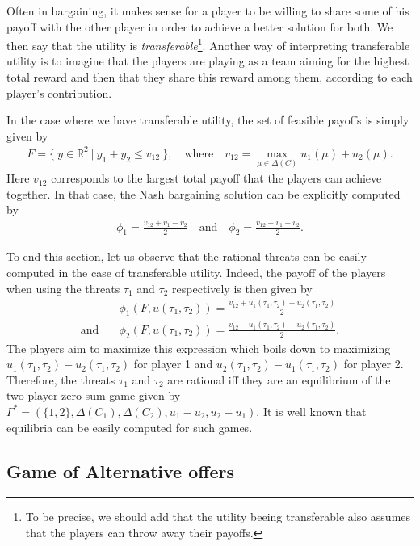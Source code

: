 Often in bargaining, it makes sense for a player to be willing to share some of his payoff with the other player in order to achieve a better solution for both. We then say that the utility is \emph{transferable}\footnote{\footnotesize To be precise, we should add that the utility beeing transferable also assumes that the players can throw away their payoffs.}. Another way of interpreting transferable utility is to imagine that the players are playing as a team aiming for the highest total reward and then that they share this reward among them, according to each player's contribution.

In the case where we have transferable utility, the set of feasible payoffs is simply given by
\begin{align*}
	F = \{ \ y \in \mathbb{R}^2 \ | \ y_1 + y_2 \leq v_{12} \ \}, \quad \text{where} \quad v_{12} = \max_{\mu \in \Delta(C)} u_1(\mu) + u_2(\mu).
\end{align*}
Here $v_{12}$ corresponds to the largest total payoff that the players can achieve together. In that case, the Nash bargaining solution can be explicitly computed by
\begin{align*}
	\phi_1 = \frac{v_{12} + v_1 - v_2}{2} \quad \text{and} \quad \phi_2 = \frac{v_{12} - v_1 + v_2}{2}.
\end{align*}

To end this section, let us observe that the rational threats can be easily computed in the case of transferable utility. Indeed, the payoff of the players when using the threats $\tau_1$ and $\tau_2$ respectively is then given by
\begin{align*}
	&\phi_1(F, u(\tau_1, \tau_2)) = \frac{v_{12} + u_1(\tau_1, \tau_2) - u_2(\tau_1, \tau_2)}{2}\\ \text{and} \quad &\phi_2(F, u(\tau_1, \tau_2)) = \frac{v_{12} - u_1(\tau_1, \tau_2) + u_2(\tau_1, \tau_2)}{2}.
\end{align*}
The players aim to maximize this expression which boils down to maximizing $u_1(\tau_1, \tau_2) - u_2(\tau_1, \tau_2)$ for player 1 and $u_2(\tau_1, \tau_2) - u_1(\tau_1, \tau_2)$ for player 2. Therefore, the threats $\tau_1$ and $\tau_2$ are rational iff they are an equilibrium of the two-player zero-sum game given by $\Gamma^*=(\{1,2\}, \Delta(C_1), \Delta(C_2), u_1-u_2, u_2-u_1)$. It is well known that equilibria can be easily computed for such games.

\subsection{Game of Alternative offers}

